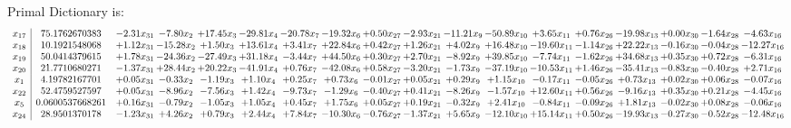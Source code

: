 \documentclass[9pt]{article}
\begin{document}
Primal Dictionary is:
\[\begin{array}{c| c c@{\hskip 2pt} c@{\hskip 2pt} c@{\hskip 2pt} c@{\hskip 2pt} c@{\hskip 2pt} c@{\hskip 2pt} c@{\hskip 2pt} c@{\hskip 2pt} c@{\hskip 2pt} c@{\hskip 2pt} c@{\hskip 2pt} c@{\hskip 2pt} c@{\hskip 2pt} c@{\hskip 2pt} c@{\hskip 2pt} c@{\hskip 2pt} }
 x_{17}   &  75.1762670383 & -2.31 x_{31} & -7.80 x_{2} & + 17.45 x_{3} & -29.81 x_{4} & -20.78 x_{7} & -19.32 x_{6} & +  0.50 x_{27} & -2.93 x_{21} & -11.21 x_{9} & -50.89 x_{10} & +  3.65 x_{11} & +  0.76 x_{26} & -19.98 x_{13} & +  0.00 x_{30} & -1.64 x_{28} & -4.63 x_{16}\\
 x_{18}   &  10.1921548068 & +  1.12 x_{31} & -15.28 x_{2} & +  1.50 x_{3} & + 13.61 x_{4} & +  3.41 x_{7} & + 22.84 x_{6} & +  0.42 x_{27} & +  1.26 x_{21} & +  4.02 x_{9} & + 16.48 x_{10} & -19.60 x_{11} & -1.14 x_{26} & + 22.22 x_{13} & -0.16 x_{30} & -0.04 x_{28} & -12.27 x_{16}\\
 x_{19}   &  50.0414379615 & +  1.78 x_{31} & -24.36 x_{2} & -27.49 x_{3} & + 31.18 x_{4} & -3.44 x_{7} & + 44.50 x_{6} & +  0.30 x_{27} & +  2.70 x_{21} & -8.92 x_{9} & + 39.85 x_{10} & -7.74 x_{11} & -1.62 x_{26} & + 34.68 x_{13} & +  0.35 x_{30} & +  0.72 x_{28} & -6.31 x_{16}\\
 x_{20}   &  21.7710680271 & -1.37 x_{31} & + 28.44 x_{2} & + 20.22 x_{3} & -41.91 x_{4} & +  0.76 x_{7} & -42.08 x_{6} & +  0.58 x_{27} & -3.20 x_{21} & -1.73 x_{9} & -37.19 x_{10} & -10.53 x_{11} & +  1.46 x_{26} & -35.41 x_{13} & -0.83 x_{30} & -0.40 x_{28} & +  2.71 x_{16}\\
 x_{1}   &  4.19782167701 & +  0.05 x_{31} & -0.33 x_{2} & -1.19 x_{3} & +  1.10 x_{4} & +  0.25 x_{7} & +  0.73 x_{6} & -0.01 x_{27} & +  0.05 x_{21} & +  0.29 x_{9} & +  1.15 x_{10} & -0.17 x_{11} & -0.05 x_{26} & +  0.73 x_{13} & +  0.02 x_{30} & +  0.06 x_{28} & -0.07 x_{16}\\
 x_{22}   &  52.4759527597 & +  0.05 x_{31} & -8.96 x_{2} & -7.56 x_{3} & +  1.42 x_{4} & -9.73 x_{7} & -1.29 x_{6} & -0.40 x_{27} & +  0.41 x_{21} & -8.26 x_{9} & -1.57 x_{10} & + 12.60 x_{11} & +  0.56 x_{26} & -9.16 x_{13} & +  0.35 x_{30} & +  0.21 x_{28} & -4.45 x_{16}\\
 x_{5}   &  0.0600537668261 & +  0.16 x_{31} & -0.79 x_{2} & -1.05 x_{3} & +  1.05 x_{4} & +  0.45 x_{7} & +  1.75 x_{6} & +  0.05 x_{27} & +  0.19 x_{21} & -0.32 x_{9} & +  2.41 x_{10} & -0.84 x_{11} & -0.09 x_{26} & +  1.81 x_{13} & -0.02 x_{30} & +  0.08 x_{28} & -0.06 x_{16}\\
 x_{24}   &  28.9501370178 & -1.23 x_{31} & +  4.26 x_{2} & +  0.79 x_{3} & +  2.44 x_{4} & +  7.84 x_{7} & -10.30 x_{6} & -0.76 x_{27} & -1.37 x_{21} & +  5.65 x_{9} & -12.10 x_{10} & + 15.14 x_{11} & +  0.50 x_{26} & -19.93 x_{13} & -0.27 x_{30} & -0.52 x_{28} & -12.48 x_{16}\\

\end{array}\]
\end{document}
